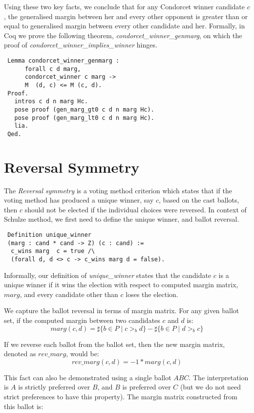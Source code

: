  Using these two key facts, we conclude that for any Condorcet winner candidate $c$, 
 the generalised margin between her and every other opponent is greater than or equal 
 to generalised margin between every other candidate and her.  Formally, 
 in Coq we prove the following theorem, \textit{condorcet\_winner\_genmarg}, on which  the proof of 
 \textit{condorcet\_winner\_implies\_winner} hinges. 
 
\begin{verbatim}
 Lemma condorcet_winner_genmarg :
      forall c d marg, 
      condorcet_winner c marg -> 
      M  (d, c) <= M (c, d).  
 Proof.
   intros c d n marg Hc.
   pose proof (gen_marg_gt0 c d n marg Hc).
   pose proof (gen_marg_lt0 c d n marg Hc).
   lia.
 Qed.
\end{verbatim}
   
\section{Reversal Symmetry}
 The \textit{Reversal symmetry} is a voting method criterion which states that if the voting method has produced a unique 
 winner, say $c$, based on the cast ballots, then $c$ should not be elected if the individual choices were 
 reversed. In context of Schulze method, we first need to define the unique winner, and ballot reversal. 
 
 \begin{verbatim}
 Definition unique_winner 
 (marg : cand * cand -> Z) (c : cand) :=
  c_wins marg  c = true /\
  (forall d, d <> c -> c_wins marg d = false).
\end{verbatim}  

Informally, our definition of \textit{unique\_winner} states that the candidate $c$ is a unique winner
if it wins the election with respect to computed margin matrix, $marg$, and every  candidate 
other than $c$ loses the election. 

We capture the ballot reversal in terms of margin matrix. For any given ballot set, if the computed 
margin between two candidates $c$ and $d$ is: 
\[
  marg(c, d) = \sharp \lbrace b \in P \mid c >_b d \rbrace -
            \sharp \lbrace b \in P \mid d >_b c \rbrace
\] 

If we reverse each ballot from the ballot set, then the new margin matrix, denoted as $rev\_marg$, would be:
\[
  rev\_marg(c, d) = -1 * marg (c, d)
\] 

This fact can also be demonstrated using a single ballot $ABC$. The interpretation is $A$ is strictly preferred over $B$, 
and $B$ is preferred over $C$ (but we do not need strict preferences to have this property). 
The margin matrix constructed from this ballot is: 

